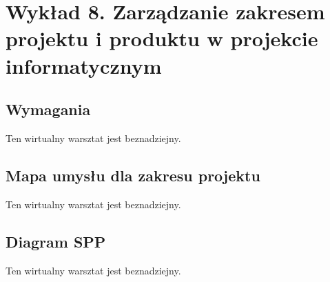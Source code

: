 \chapter{Wykład 8. Zarządzanie zakresem projektu i produktu w projekcie informatycznym}

\section{Wymagania}

Ten wirtualny warsztat jest beznadziejny.


\section{Mapa umysłu dla zakresu projektu}

Ten wirtualny warsztat jest beznadziejny.


\section{Diagram SPP}

Ten wirtualny warsztat jest beznadziejny.


